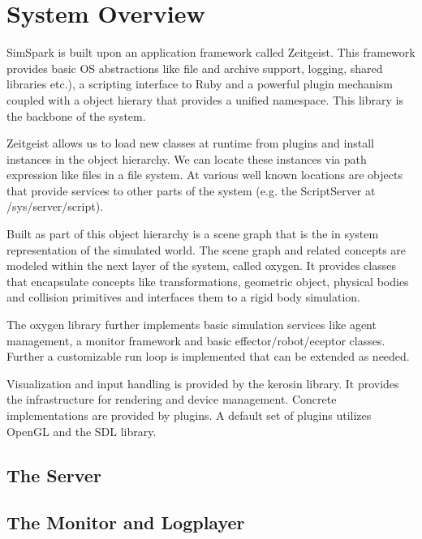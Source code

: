  \chapter{System Overview}



SimSpark is built upon an application framework called Zeitgeist. This
framework provides basic OS abstractions like file and archive
support, logging, shared libraries etc.), a scripting interface to
Ruby and a powerful plugin mechanism coupled with a object hierary
that provides a unified namespace. This library is the backbone of the
system.

Zeitgeist allows us to load new classes at runtime from plugins and
install instances in the object hierarchy. We can locate these
instances via path expression like files in a file system. At various
well known locations are objects that provide services to other parts
of the system (e.g. the ScriptServer at /sys/server/script).

Built as part of this object hierarchy is a scene graph that is the in
system representation of the simulated world. The scene graph and
related concepts are modeled within the next layer of the system,
called oxygen. It provides classes that encapsulate concepts like
transformations, geometric object, physical bodies and collision
primitives and interfaces them to a rigid body simulation.

The oxygen library further implements basic simulation services like
agent management, a monitor framework and basic effector/robot/eceptor
classes. Further a customizable run loop is implemented that can be
extended as needed.

Visualization and input handling is provided by the kerosin
library. It provides the infrastructure for rendering and device
management. Concrete implementations are provided by plugins. A
default set of plugins utilizes OpenGL and the SDL library.


\section{The Server}


\section{The Monitor and Logplayer}


